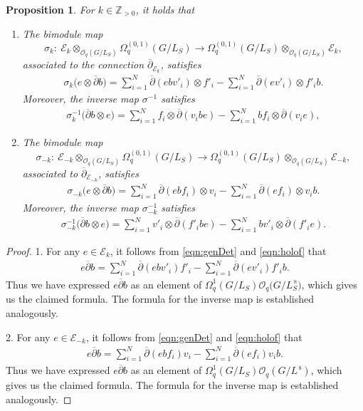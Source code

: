 \documentclass[pdftex]{sigma}
\numberwithin{equation}{section}
\newtheorem{prop}[Theorem]{Proposition}
 { \theoremstyle{definition}
\newtheorem{defn}[Theorem]{Definition}
\newtheorem{Note}[Theorem]{Note}
\newtheorem{eg}[Theorem]{Example}
\newtheorem{Remark}[Theorem]{Remark} }
\newcommand\adel{\overline{\partial}}
\begin{document}
\begin{prop}
For $k \in \mathbb{Z}_{> 0}$, it holds that
\begin{enumerate}\itemsep=0pt
\item[$1.$] The bimodule map
\[
\sigma_k\colon \ \mathcal{E}_k \otimes_{\mathcal{O}_q(G/L_S)} \Omega^{(0,1)}_q(G/L_S) \to \Omega^{(0,1)}_q(G/L_S) \otimes_{\mathcal{O}_q(G/L_S)} \mathcal{E}_{k},
\]
associated to the connection $\adel_{\mathcal{E}_{k}}$, satisfies
\begin{gather*}
\sigma_k\big(e \otimes \adel b\big) = \sum_{i=1}^{N} \adel(ebv'_i) \otimes f'_i - \sum_{i=1}^{N} \adel(ev'_i) \otimes f'_ib.
\end{gather*}
Moreover, the inverse map $\sigma^{-1}$ satisfies
\begin{gather*}
\sigma^{-1}_k\big(\adel b \otimes e\big) = \sum_{i=1}^N f_i \otimes \adel(v_ibe) - \sum_{i=1}^N bf_i \otimes \adel(v_ie),
\end{gather*}

\item[$2.$] The bimodule map
\[
\sigma_{-k}\colon \ \mathcal{E}_{-k} \otimes_{\mathcal{O}_q(G/L_S)} \Omega^{(0,1)}_q(G/L_S) \to \Omega^{(0,1)}_q(G/L_S) \otimes_{\mathcal{O}_q(G/L_S)} \mathcal{E}_{-k},
\]
associated to $\adel_{\mathcal{E}_{-k}}$, satisfies
\begin{gather*}
\sigma_{-k}\big(e \otimes \adel b\big) = \sum_{i=1}^{N} \adel(ebf_i) \otimes v_i - \sum_{i=1}^{N} \adel(ef_i) \otimes v_ib.
\end{gather*}
Moreover, the inverse map $\sigma^{-1}_{-k}$ satisfies
\begin{gather*}
\sigma^{-1}_{-k}\big(\adel b \otimes e\big) = \sum_{i=1}^N v'_i \otimes \adel(f'_ibe) - \sum_{i=1}^N bv'_i \otimes \adel(f'_ie).
\end{gather*}
\end{enumerate}
\end{prop}
\begin{proof}
1. For any $e \in \mathcal{E}_k$, it follows from \eqref{eqn:genDet} and \eqref{eqn:holof} that
\begin{gather*}
e\adel b =
\sum_{i=1}^{N} \adel(ebv'_i)f'_i - \sum_{i=1}^{N} \adel(ev'_i)f'_ib.
\end{gather*}
Thus we have expressed $e\adel b$ as an element of $\Omega^1_q(G/L_S)\mathcal{O}_q\big(G/L^{\,\mathrm{s}}_S\big)$, which gives us the claimed formula. The formula for the inverse map is established analogously.

2. For any $e \in \mathcal{E}_{-k}$, it follows from \eqref{eqn:genDet} and \eqref{eqn:holof} that
\begin{gather*}
e\adel b
= \sum_{i=1}^{N} \adel(ebf_i)v_i - \sum_{i=1}^{N} \adel(ef_i)v_ib.
\end{gather*}
Thus we have expressed $e\adel b$ as an element of $\Omega^1_q(G/L_S)\mathcal{O}_q(G/L^{\,\mathrm{s}})$, which gives us the claimed formula. The formula for the inverse map is established analogously.
\end{proof}
\end{document}
